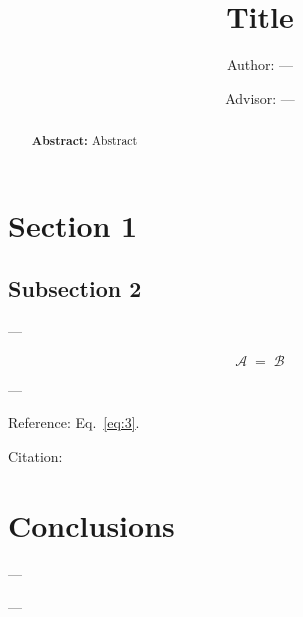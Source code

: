 \documentclass[twocolumn]{revtex4}
\providecommand{\eq}[2]{
    \begin{equation}
        #2
    \label{eq:#1}
    \end{equation}
}
\DeclareMathOperator{\calA}{\mathcal{A}}
\DeclareMathOperator{\calB}{\mathcal{B}}
\begin{document}
\pagestyle{fancy}

\title{Title}
\author{Author: ---}
\author{Advisor: ---}

\begin{abstract}
    {\bf Abstract:} Abstract
\end{abstract}

\maketitle

\section{Section 1} \label{s:1}

\subsection{Subsection 2} \label{ss:2}

---
\eq{3}{
    \calA = \calB
}
---

Reference: Eq.~\ref{eq:3}.

Citation: \cite{bekenstein_black_1973}

\newpage

\section{Conclusions} \label{s:Conclusions}

---

\begin{acknowledgments}
    ---
\end{acknowledgments}


\end{document}
